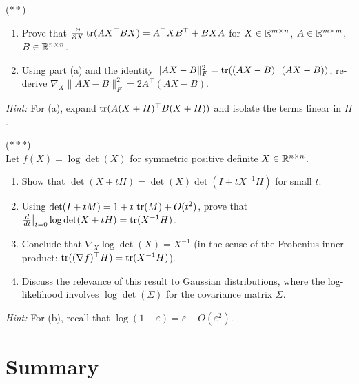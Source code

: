 \documentclass[11pt,a4paper]{article}
\begin{document}
\begin{exercise}
\label{exer:trace_deriv}
\textnormal{(\(**\))} \\
\begin{enumerate}[nosep,label=(\alph*)]
  \item Prove that $\frac{\partial}{\partial X} \operatorname{tr}(AX^\top BX)
        = A^\top X B^\top + BXA$ for $X \in \mathbb{R}^{m \times n}$,
        $A \in \mathbb{R}^{m \times m}$, $B \in \mathbb{R}^{n \times n}$.
  \item Using part (a) and the identity $\|AX - B\|_F^2 = \operatorname{tr}((AX-B)^\top(AX-B))$,
        re-derive $\nabla_X \|AX - B\|_F^2 = 2A^\top(AX - B)$.
\end{enumerate}
\textit{Hint:} For (a), expand $\operatorname{tr}(A(X+H)^\top B(X+H))$ and isolate
the terms linear in $H$.
\end{exercise}

\begin{exercise}
\label{exer:logdet}
\textnormal{(\(***\))} \\
Let $f(X) = \log\det(X)$ for symmetric positive definite
$X \in \mathbb{R}^{n \times n}$.
\begin{enumerate}[nosep,label=(\alph*)]
  \item Show that $\det(X + tH) = \det(X)\det(I + tX^{-1}H)$
        for small $t$.
  \item Using $\det(I + tM) = 1 + t\,\operatorname{tr}(M) + O(t^2)$, prove that
        $\frac{d}{dt}\big|_{t=0} \log\det(X + tH) = \operatorname{tr}(X^{-1}H)$.
  \item Conclude that $\nabla_X \log\det(X) = X^{-1}$ (in the sense
        of the Frobenius inner product: $\operatorname{tr}((\nabla f)^\top H) = \operatorname{tr}(X^{-1}H)$).
  \item Discuss the relevance of this result to Gaussian distributions,
        where the log-likelihood involves $\log\det(\Sigma)$ for the
        covariance matrix $\Sigma$.
\end{enumerate}
\textit{Hint:} For (b), recall that $\log(1 + \varepsilon) = \varepsilon + O(\varepsilon^2)$.
\end{exercise}

\section{Summary}
\label{sec:summary}
\end{document}
